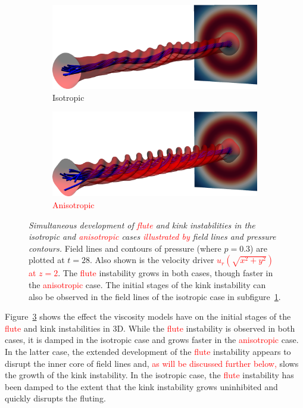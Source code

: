 \documentclass[12pt]{article}
\newcommand{\rs}[2]{\textcolor{red}{#2}}
\newcommand{\mycaption}[2]{\caption[#1]{\emph{#1} #2}}
\begin{document}
\begin{figure}[t]
  \centering
    \begin{subfigure}{0.49\textwidth}
      \includegraphics[width=\linewidth]{field_line_plots/cropped/v-4r-4-isotropic_0014_cropped.png}
      \caption{Isotropic}
      \label{fig:field_line_plots_iso}
    \end{subfigure}
    \hfill
    \begin{subfigure}{0.49\textwidth}
      \includegraphics[width=\linewidth]{field_line_plots/cropped/v-4r-4-switching_0014_cropped.png}
      \caption{\rs{Switching}{Anisotropic}}
      \label{fig:field_line_plots_swi}
    \end{subfigure}
\mycaption{Simultaneous development of \rs{fluting}{flute} and kink
  instabilities in the isotropic and \rs{switching}{anisotropic} cases
  \rs{as}{illustrated by} field lines and pressure contours.}{Field
  lines and contours of pressure (where $p=0.3$) are plotted at
  $t=28$. Also shown is the velocity driver \rs{as a slice}{$u_r(\sqrt{x^2+y^2})$ at $z=2$}. The \rs{fluting}{flute} instability grows in both cases, though faster in the \rs{switching}{anisotropic} case. The initial stages of the kink instability can also be observed in the field lines of the isotropic case in subfigure~\ref{fig:field_line_plots_iso}.}
\label{fig:kink_field_line_plots}%
\end{figure}

Figure~\ref{fig:kink_field_line_plots} shows the effect the viscosity
models have on the initial stages of the \rs{fluting}{flute} and kink
instabilities in 3D. While the \rs{fluting}{flute} instability is
observed in both cases, it is damped in the isotropic case and grows
faster in the \rs{switching}{anisotropic} case. In the latter case,
the extended development of the \rs{fluting}{flute} instability
appears to disrupt the inner core of field lines and, \rs{(as shall be
  seen)}{as will be discussed further below,} slows the growth of the
kink instability. In the isotropic case, the \rs{fluting}{flute}
instability has been damped to the extent that the kink instability
grows uninhibited and quickly disrupts the fluting. 
\end{document}
